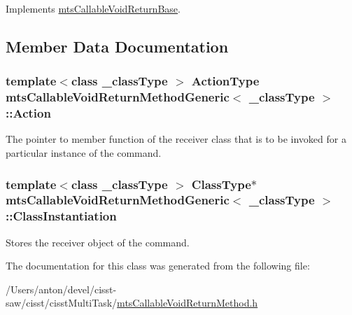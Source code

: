 Implements \hyperlink{classmts_callable_void_return_base_ab5c0d1c688e1996c31260e95525f8f6d}{mts\+Callable\+Void\+Return\+Base}.



\subsection{Member Data Documentation}
\hypertarget{classmts_callable_void_return_method_generic_a3d55827aaf012a7732d1956ef5ff583e}{}
\subsubsection[{Action}]{\setlength{\rightskip}{0pt plus 5cm}template$<$class \+\_\+class\+Type $>$ {\bf Action\+Type} {\bf mts\+Callable\+Void\+Return\+Method\+Generic}$<$ \+\_\+class\+Type $>$\+::Action\hspace{0.3cm}{\ttfamily [protected]}}\label{classmts_callable_void_return_method_generic_a3d55827aaf012a7732d1956ef5ff583e}
The pointer to member function of the receiver class that is to be invoked for a particular instance of the command. \hypertarget{classmts_callable_void_return_method_generic_a15414bc65b1c9d9b97b8cfcbc7c3b2d8}{}
\subsubsection[{Class\+Instantiation}]{\setlength{\rightskip}{0pt plus 5cm}template$<$class \+\_\+class\+Type $>$ {\bf Class\+Type}$\ast$ {\bf mts\+Callable\+Void\+Return\+Method\+Generic}$<$ \+\_\+class\+Type $>$\+::Class\+Instantiation\hspace{0.3cm}{\ttfamily [protected]}}\label{classmts_callable_void_return_method_generic_a15414bc65b1c9d9b97b8cfcbc7c3b2d8}
Stores the receiver object of the command. 

The documentation for this class was generated from the following file\+:\begin{DoxyCompactItemize}
\item 
/\+Users/anton/devel/cisst-\/saw/cisst/cisst\+Multi\+Task/\hyperlink{mts_callable_void_return_method_8h}{mts\+Callable\+Void\+Return\+Method.\+h}\end{DoxyCompactItemize}
